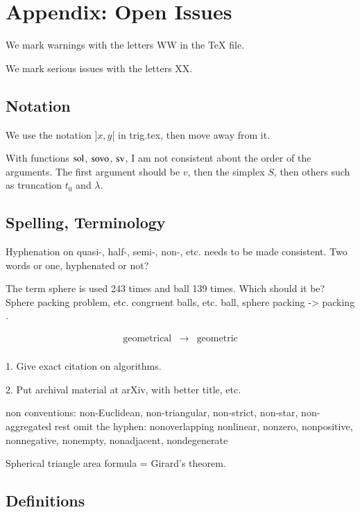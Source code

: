 \chapter{Appendix: Open Issues} %

\label{XX}\label{tarski:XX}

We mark warnings with the letters WW in 
the TeX file.

We mark serious issues with the letters XX.

\section{Notation}

We use the notation $]x,y[$ in trig.tex, then move away from it.

With functions $\operatorname{sol}$, ${\operatorname{sovo}}$, ${\operatorname{sv}}$, I am not
consistent about the order of the arguments.
The first argument should be $v$, then the simplex $S$,
then others such as truncation $t_0$ and $\lambda$.

\section{Spelling, Terminology}

Hyphenation on  quasi-, half-, semi-, non-, etc. needs to be made
consistent.  Two words or one, hyphenated or not?

The term sphere is used 243 times and ball 139 times. Which should it be?
Sphere packing problem, etc.  congruent balls, etc.
ball, sphere packing -> packing .

$$
\begin{array}{lll}
 \text{geometrical} &\to& \text{geometric}\\
\end{array}
$$


 1. Give exact citation on algorithms.

 2. Put archival material at arXiv, with better title, etc.



 non conventions:
 non-Euclidean, non-triangular, non-strict, non-star, non-aggregated
 rest omit the hyphen: nonoverlapping nonlinear, nonzero, nonpositive, nonnegative,
   nonempty, nonadjacent, nondegenerate


Spherical triangle area formula = Girard's theorem.

\section{Definitions}

